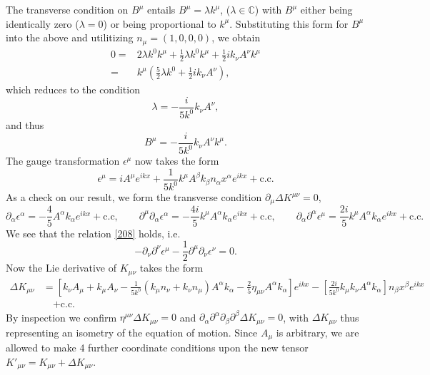 \documentclass[10pt,letterpaper]{article}
\numberwithin{equation}{subsection}
\begin{document}
\newpage
The transverse condition on $B^\mu$ entails $B^\mu = \lambda k^\mu$, ($\lambda \in \mathbb C$) with $B^\mu$ either being identically zero ($\lambda = 0$) or being proportional to $k^\mu$. Substituting this form for $B^\mu$ into the above and utilitizing $n_\mu = (1,0,0,0)$, we obtain
\begin{align}
0={}&2 \lambda k^0k^\mu + \frac12 \lambda k^0 k^\mu + \frac12 i k_\nu A^\nu k^\mu 
\nonumber\\
={}&k^\mu\left( \frac52\lambda k^0 + \frac12 i k_\nu A^\nu\right),
\end{align}
which reduces to the condition
\begin{equation}
 \lambda = -\frac{i}{5 k^0} k_\nu A^\nu,
\end{equation}
and thus
\begin{equation}
B^\mu = -\frac{i}{5 k^0} k_\nu A^\nu k^\mu.
\end{equation}
The gauge transformation $\epsilon^\mu$ now takes the form
\begin{equation}
\epsilon^\mu = i A^\mu e^{ikx} + \frac{1}{5k^0}k^\mu A^\beta k_\beta  n_\alpha x^\alpha e^{ikx}+\text{c.c}.
\end{equation}
As a check on our result, we form the transverse condition $\partial_\mu \Delta K^{\mu\nu}=0$, 
\begin{equation}
\partial_\alpha \epsilon^\alpha =  -\frac{4}{5} A^\alpha k_\alpha e^{ikx}+\text{c.c},\qquad \partial^\mu \partial_\alpha \epsilon^\alpha = -\frac{4i}{5}k^\mu A^\alpha 
k_\alpha e^{ikx}+\text{c.c},\qquad \partial_\alpha\partial^\alpha \epsilon^\mu = \frac{2i}{5} k^\mu A^\alpha k_\alpha  e^{ikx}+\text{c.c}.
\end{equation}
We see that the relation \ref{208} holds, i.e.
\begin{equation}
-\partial_\nu \partial^\nu \epsilon^\mu - \frac12 \partial^\mu \partial_\nu \epsilon^\nu =0.
\end{equation}
Now the Lie derivative of $K_{\mu\nu}$ takes the form
\begin{align}
\Delta K_{\mu\nu} &= \left[ k_\nu A_\mu + k_\mu A_\nu - \frac{1}{5 k^0}\left(k_\mu n_\nu +k_\nu n_\mu\right) A^\alpha k_\alpha - \frac{2}{5}\eta_{\mu\nu} A^\alpha k_\alpha \right] e^{ikx} -\left[ \frac{2i}{5k^0}k_\mu k_\nu A^\alpha k_\alpha \right]n_\beta x^\beta e^{ikx}
\nonumber\\
&\quad + \text{c.c.}
\end{align}
By inspection we confirm $\eta^{\mu\nu}\Delta K_{\mu\nu} =0$ and $\partial_\alpha \partial^\alpha \partial_\beta \partial^\beta \Delta K_{\mu\nu} = 0$, with $\Delta K_{\mu\nu}$ thus representing an isometry of the equation of motion. Since $A_\mu$ is arbitrary, we are allowed to make 4 further coordinate conditions upon the new tensor $K'_{\mu\nu} = K_{\mu\nu} + \Delta K_{\mu\nu}$. 
\end{document}
